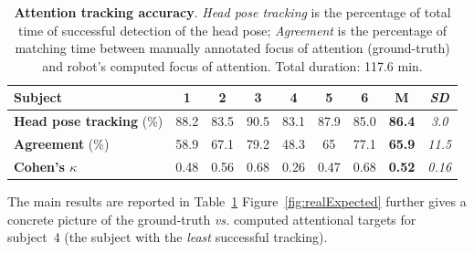 \documentclass{sig-alternate}
\newcommand{\vs}{\textit{vs.}\xspace}
\begin{document}
\begin{table}[ht!]
    \centering
    \caption{\textbf{Attention tracking accuracy}. \emph{Head pose
    tracking} is the percentage of total time of successful detection of the
    head pose; \emph{Agreement} is the percentage of matching time
    between manually annotated focus of attention (ground-truth) and robot's
    computed focus of attention. Total duration: 117.6 min.}

    \begin{tabular}{p{5.5cm}cccccccc}
        \toprule
        {\bf Subject} & 1 & 2 & 3 & 4 & 5 & 6 & {\bf M} & {\it SD} \\
        \midrule
        {\bf Head pose tracking} (\%) & 88.2 & 83.5 & 90.5 & 83.1 & 87.9 & 85.0 & {\bf 86.4} & {\it 3.0} \\ 
        \midrule
        {\bf Agreement} (\%) & 58.9 & 67.1 & 79.2 & 48.3 & 65 & 77.1 & {\bf 65.9} & {\it 11.5}\\
        {\bf Cohen's $\kappa$} & 0.48 & 0.56 & 0.68 & 0.26 & 0.47 & 0.68 & {\bf 0.52} & {\it 0.16}\\
        \bottomrule
    \end{tabular}
    \label{tab:results}
\end{table}

The main results are reported in Table~\ref{tab:results}
Figure~\ref{fig:realExpected} further gives a concrete picture of the
ground-truth \vs computed attentional targets for subject~4 (the subject with
the \emph{least} successful tracking).

%
\end{document}
